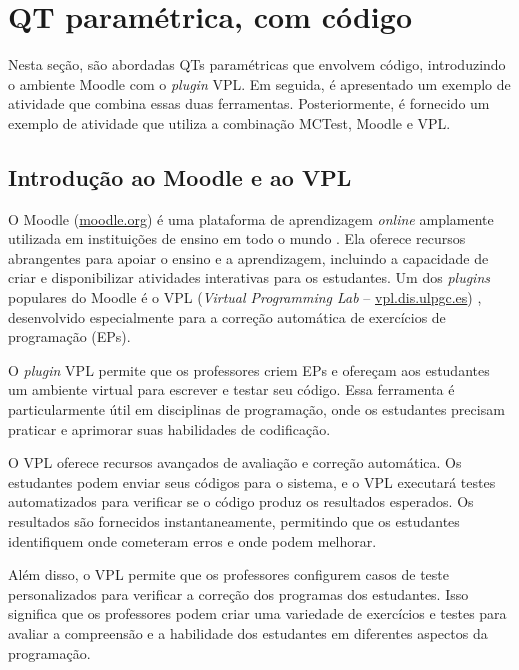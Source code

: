 \section{QT paramétrica, com código}\label{sec:questoesQT_VPL}

Nesta seção, são abordadas QTs paramétricas que envolvem código, introduzindo o ambiente Moodle com o \textit{plugin} VPL. Em seguida, é apresentado um exemplo de atividade que combina essas duas ferramentas. Posteriormente, é fornecido um exemplo de atividade que utiliza a combinação MCTest, Moodle e VPL.

\subsection{Introdução ao Moodle e ao VPL}

O Moodle (\href{www.moodle.org}{moodle.org}) é uma plataforma de aprendizagem \textit{online} amplamente utilizada em instituições de ensino em todo o mundo \cite{presedo2015calibracion}. Ela oferece recursos abrangentes para apoiar o ensino e a aprendizagem, incluindo a capacidade de criar e disponibilizar atividades interativas para os estudantes. Um dos \textit{plugins} populares do Moodle é o VPL (\textit{Virtual Programming Lab} -- \href{https://vpl.dis.ulpgc.es/}{vpl.dis.ulpgc.es}) \cite{rodriguez2012virtual}, desenvolvido especialmente para a correção automática de exercícios de programação (EPs).

O \textit{plugin} VPL permite que os professores criem EPs e ofereçam aos estudantes um ambiente virtual para escrever e testar seu código. Essa ferramenta é particularmente útil em disciplinas de programação, onde os estudantes precisam praticar e aprimorar suas habilidades de codificação.

O VPL oferece recursos avançados de avaliação e correção automática. Os estudantes podem enviar seus códigos para o sistema, e o VPL executará testes automatizados para verificar se o código produz os resultados esperados. Os resultados são fornecidos instantaneamente, permitindo que os estudantes identifiquem onde cometeram erros e onde podem melhorar.

Além disso, o VPL permite que os professores configurem casos de teste personalizados para verificar a correção dos programas dos estudantes. Isso significa que os professores podem criar uma variedade de exercícios e testes para avaliar a compreensão e a habilidade dos estudantes em diferentes aspectos da programação.

